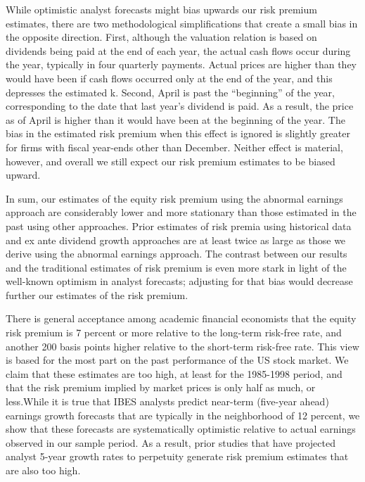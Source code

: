 \documentclass[12 pt]{article}
\begin{document}
\par While optimistic analyst forecasts might bias upwards our risk premium estimates, there
are two methodological simplifications that create a small bias in the opposite direction. First, although the valuation relation is based on dividends being paid at the end of each year, the actual cash flows occur during the year, typically in four quarterly payments. Actual prices are higher than they would have been if cash flows occurred only at the end of the year, and this depresses the estimated k. Second, April is past the “beginning” of the year, corresponding to the date that last year’s dividend is paid. As a result, the price as of April is higher than it would have been at the beginning of the year. The bias in the estimated risk premium when this effect is ignored is slightly greater for firms with fiscal year-ends other than December. Neither effect is material, however, and overall we still expect our risk premium estimates to be biased upward.
\par In sum, our estimates of the equity risk premium using the abnormal earnings approach are considerably lower and more stationary than those estimated in the past using other approaches. Prior estimates of risk premia using historical data and ex ante dividend growth approaches are at least twice as large as those we derive using the abnormal earnings approach. The contrast between our results and the traditional estimates of risk premium is even more stark in light of the well-known optimism in analyst forecasts; adjusting for that bias would decrease further our estimates of the risk premium.
\par There is general acceptance among academic financial economists that the equity risk premium is 7 percent or more relative to the long-term risk-free rate, and another 200 basis points higher relative to the short-term risk-free rate. This view is based for the most part on the past performance of the US stock market. We claim that these estimates are too high, at least for the 1985-1998 period, and that the risk premium implied by market prices is only half as much, or less.While it is true that IBES analysts predict near-term (five-year ahead) earnings growth forecasts that are typically in the neighborhood of 12 percent, we show that these forecasts are systematically optimistic relative to actual earnings observed in our sample period. As a result, prior studies that have projected analyst 5-year growth rates to perpetuity generate risk premium estimates that are also too high.
\end{document}
